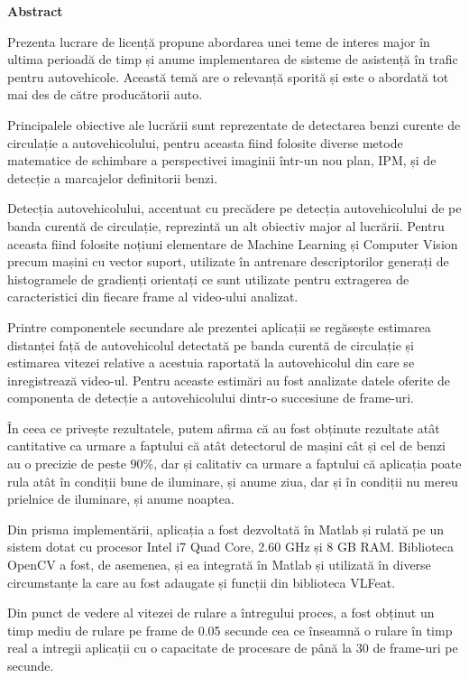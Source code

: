 \thispagestyle{plain}

\begin{center}
	\Large \textbf{Abstract}	
\end{center}

Prezenta lucrare de licență propune abordarea unei teme de interes major în ultima perioadă de timp și anume implementarea de sisteme de asistență în trafic pentru autovehicole. Această temă are o relevanță sporită și este o abordată tot mai des de către producătorii auto. 

Principalele obiective ale lucrării sunt reprezentate de detectarea benzi curente de circulație a autovehicolului, pentru aceasta fiind folosite diverse metode matematice de schimbare a perspectivei imaginii într-un nou plan, IPM, și de detecție a marcajelor definitorii benzi.

Detecția autovehicolului, accentuat cu precădere pe detecția autovehicolului de pe banda curentă de circulație, reprezintă un alt obiectiv major al lucrării. Pentru aceasta fiind folosite noțiuni elementare de Machine Learning și Computer Vision precum mașini cu vector suport, utilizate în antrenare descriptorilor generați de histogramele de gradienți orientați ce sunt utilizate pentru extragerea de caracteristici din fiecare frame al video-ului analizat.

Printre componentele secundare ale prezentei aplicații se regăsește estimarea distanței față de autovehicolul detectată pe banda curentă de circulație și estimarea vitezei relative a acestuia raportată la autovehicolul din care se inregistrează video-ul. Pentru aceaste estimări au fost analizate datele oferite de componenta de detecție a autovehicolului dintr-o succesiune de frame-uri.

În ceea ce privește rezultatele, putem afirma că au fost obținute rezultate atât cantitative ca urmare a faptului că atât detectorul de mașini cât și cel de benzi au o precizie de peste $90\%$, dar și calitativ ca urmare a faptului că aplicația poate rula atât în condiții bune de iluminare, și anume ziua, dar și în condiții nu mereu prielnice de iluminare, și anume noaptea.

Din prisma implementării, aplicația a fost dezvoltată în Matlab și rulată pe un sistem dotat cu procesor Intel i7 Quad Core, 2.60 GHz și 8 GB RAM. Biblioteca OpenCV a fost, de asemenea, și ea integrată în Matlab și utilizată în diverse circumstanțe la care au fost adaugate și funcții din biblioteca VLFeat.

Din punct de vedere al vitezei de rulare a întregului proces, a fost obținut un timp mediu de rulare pe frame de 0.05 secunde cea ce înseamnă o rulare în timp real a intregii aplicații cu o capacitate de procesare de până la 30 de frame-uri pe secunde.  
\vspace*{\fill}
